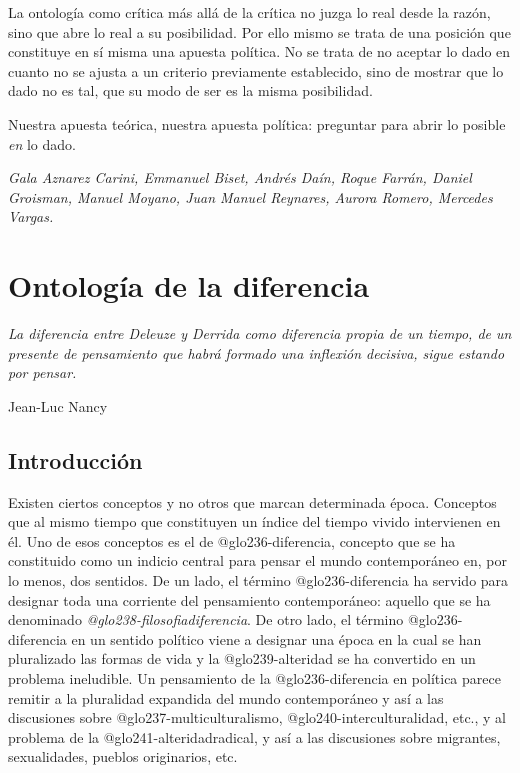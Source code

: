 La ontología como crítica más allá de la crítica no juzga lo real desde la razón, sino que abre lo real a su posibilidad. Por ello mismo se trata de una posición que constituye en sí misma una apuesta política. No se trata de no aceptar lo dado en cuanto no se ajusta a un criterio previamente establecido, sino de mostrar que lo dado no es tal, que su modo de ser es la misma posibilidad.

Nuestra apuesta teórica, nuestra apuesta política: preguntar para abrir lo posible \emph{en} lo dado.


\emph{Gala Aznarez Carini, Emmanuel Biset, Andrés Daín, Roque Farrán, Daniel Groisman, Manuel Moyano, Juan Manuel Reynares, Aurora Romero, Mercedes Vargas.}



\mainmatter

\chapter{Ontología de la diferencia}


\epigraph{\emph{La diferencia entre Deleuze y Derrida  \linebreak como diferencia propia  de un tiempo, de un presente de pensamiento que habrá formado una inflexión decisiva, sigue estando por pensar.}}{Jean-Luc Nancy}

\section{Introducción}

Existen ciertos conceptos y no otros que marcan determinada época. Conceptos que al mismo tiempo que constituyen un índice del tiempo vivido intervienen en él. Uno de esos conceptos es el de \gls{@glo236-diferencia}, concepto que se ha constituido como un indicio central para pensar el mundo contemporáneo en, por lo menos, dos sentidos. De un lado, el término \gls{@glo236-diferencia} ha servido para designar toda una corriente del pensamiento contemporáneo: aquello que se ha denominado \emph{\gls{@glo238-filosofiadiferencia}}. De otro lado, el término  \gls{@glo236-diferencia} en un sentido político viene a designar una época en la cual se han pluralizado las formas de vida y la  \gls{@glo239-alteridad} se ha convertido en un problema ineludible. Un pensamiento de la  \gls{@glo236-diferencia} en política parece remitir a la pluralidad expandida del mundo contemporáneo y así a las discusiones sobre  \gls{@glo237-multiculturalismo}, \gls{@glo240-interculturalidad}, etc., y al problema de la \gls{@glo241-alteridadradical}, y así a las discusiones sobre migrantes, sexualidades, pueblos originarios, etc.


